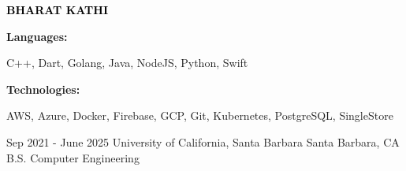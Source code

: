 \documentclass[9pt]{developercv} %
\begin{document}

\begin{minipage}[t]{0.5\textwidth} 
	\vspace{-\baselineskip} %
	
	{ \fontsize{16}{20} \textcolor{black}{\textbf{\MakeUppercase{Bharat Kathi}}}} %
	
	\vspace{6pt}
    \hspace{22pt}

    \hspace{12pt}
    
\end{minipage}
\hfill
\begin{minipage}[t]{0.5\textwidth}
    \vspace{-18pt}
    \vspace{-6pt}
    
    \begin{minipage}[t]{0.2\textwidth}
        \textbf{Languages:}
    \end{minipage}
    \hfill
    \begin{minipage}[t]{0.73\textwidth}
        C++, Dart, Golang, Java, NodeJS, Python, Swift
    \end{minipage}
    \vspace{4mm}
    
    \begin{minipage}[t]{0.2\textwidth}
        \textbf{Technologies:}
    \end{minipage}
    \hfill
    \begin{minipage}[t]{0.73\textwidth}
        AWS, Azure, Docker, Firebase, GCP, Git, Kubernetes, PostgreSQL, SingleStore
    \end{minipage}
    
\end{minipage}


\vspace{-6 pt}
\begin{entrylist}
    \entry
		{Sep 2021 - June 2025}
		{University of California, Santa Barbara}
		{Santa Barbara, CA}
		{B.S. Computer Engineering}
\end{entrylist}
\end{document}

